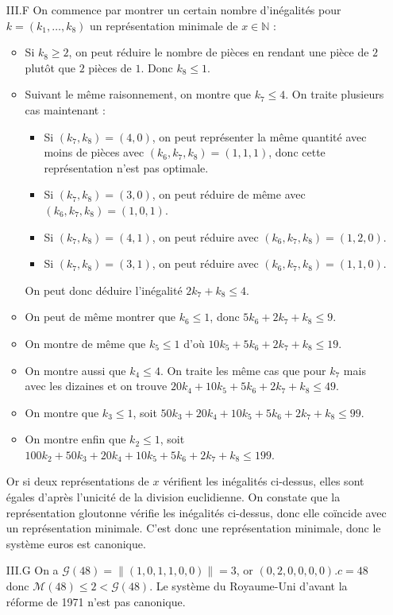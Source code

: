 \documentclass{article}
\newcommand{\N}{\mathbb{N}}
\newcommand{\M}{\mathscr{M}}
\newcommand{\G}{\mathscr{G}}
\newcommand{\norm}[1]{\|#1\|}
\newcommand{\scal}{.}
\begin{document}
\begin{enumerate}
    \item[III.F] On commence par montrer un certain nombre d'inégalités pour $k=(k_1,\ldots,k_8)$ un représentation minimale de $x\in\N$ :\begin{itemize}
            \item Si $k_8\geq 2$, on peut réduire le nombre de pièces en rendant une pièce de $2$ plutôt que $2$ pièces de $1$. Donc $k_8\leq 1$.
            \item Suivant le même raisonnement, on montre que $k_7\leq 4$. On traite plusieurs cas maintenant :\begin{itemize}
                    \item Si $(k_7,k_8) = (4,0)$, on peut représenter la même quantité avec moins de pièces avec $(k_6, k_7, k_8) = (1, 1, 1)$, donc cette représentation n'est pas optimale.
                    \item Si $(k_7,k_8) = (3,0)$, on peut réduire de même avec $(k_6,k_7,k_8) = (1, 0, 1)$.
                    \item Si $(k_7,k_8) = (4,1)$, on peut réduire avec $(k_6,k_7,k_8) = (1,2,0)$.
                    \item Si $(k_7,k_8) = (3,1)$, on peut réduire avec $(k_6,k_7,k_8) = (1,1,0)$.
                \end{itemize}
                On peut donc déduire l'inégalité $2k_7 + k_8 \leq 4$.
            \item On peut de même montrer que $k_6\leq 1$, donc $5k_6 + 2k_7 + k_8 \leq 9$.
            \item On montre de même que $k_5\leq 1$ d'où $10k_5 + 5k_6 + 2k_7 + k_8 \leq 19$.
            \item On montre aussi que $k_4 \leq 4$. On traite les même cas que pour $k_7$ mais avec les dizaines et on trouve $20k_4 + 10k_5 + 5k_6 + 2k_7 + k_8 \leq 49$.
            \item On montre que $k_3 \leq 1$, soit $50k_3 + 20k_4 + 10k_5 + 5k_6 + 2k_7 + k_8 \leq 99$.
            \item On montre enfin que $k_2 \leq 1$, soit $100k_2 + 50k_3 + 20k_4 + 10k_5 + 5k_6 + 2k_7 + k_8 \leq 199$.
        \end{itemize}

        Or si deux représentations de $x$ vérifient les inégalités ci-dessus, elles sont égales d'après l'unicité de la division euclidienne. On constate que la représentation gloutonne vérifie les inégalités ci-dessus, donc elle coïncide avec un représentation minimale. C'est donc une représentation minimale, donc le système euros est canonique.

    \item[III.G] On a $\G(48) = \norm{(1, 0, 1, 1, 0, 0)} = 3$, or $(0, 2, 0, 0, 0, 0)\scal c = 48$ donc $\M(48) \leq 2 < \G(48)$. Le système du Royaume-Uni d'avant la réforme de 1971 n'est pas canonique.
\end{enumerate}
\end{document}
